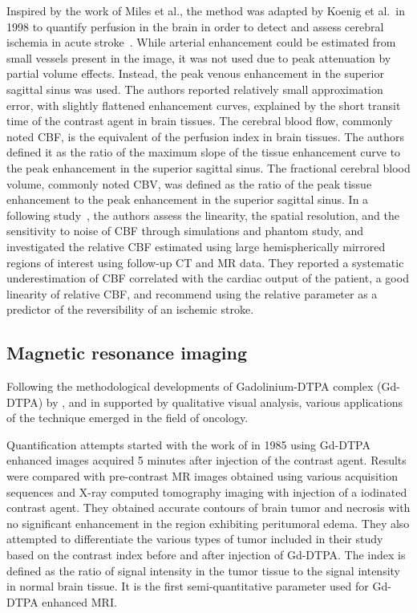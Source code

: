 Inspired by the work of Miles et al., the method was adapted by Koenig et al.~in 1998 to quantify perfusion in the brain in order to detect and assess cerebral ischemia in acute stroke~\cite{Koenig:1998ir}. 
While arterial enhancement could be estimated from small vessels present in the image, it was not used due to peak attenuation by partial volume effects. 
Instead, the peak venous enhancement in the superior sagittal sinus was used. 
The authors reported relatively small approximation error, with slightly flattened enhancement curves, explained by the short transit time of the contrast agent in brain tissues.
The cerebral blood flow, commonly noted CBF, is the equivalent of the perfusion index in brain tissues. 
The authors defined it as the ratio of the maximum slope of the tissue enhancement curve to the peak enhancement in the superior sagittal sinus.
The fractional cerebral blood volume, commonly noted CBV, was defined as the ratio of the peak tissue enhancement to the peak enhancement in the superior sagittal sinus. 
In a following study~\cite{Klotz:1999ef}, the authors assess the linearity, the spatial resolution, and the sensitivity to noise of CBF through simulations and phantom study, and investigated the relative CBF estimated using large hemispherically mirrored regions of interest using follow-up CT and MR data. 
They reported a systematic underestimation of CBF correlated with the cardiac output of the patient, a good linearity of relative CBF, and recommend using the relative parameter as a predictor of the reversibility of an ischemic stroke.


\subsection{Magnetic resonance imaging}
\label{sec:SQMR}
Following the methodological developments of Gadolinium-DTPA complex (Gd-DTPA) by \citet{Weinmann:1984gv,Brasch:1984cz}, and \citet{Wesbey:1984is} in \citeyear{Weinmann:1984gv} supported by qualitative visual analysis, various applications of the technique emerged in the field of oncology.

Quantification attempts started with the work of \citet{Felix:1985fv} in 1985 using Gd-DTPA enhanced images acquired 5 minutes after injection of the contrast agent. 
Results were compared with pre-contrast MR images obtained using various acquisition sequences and X-ray computed tomography imaging with injection of a iodinated contrast agent. 
They obtained accurate contours of brain tumor and necrosis with no significant enhancement in the region exhibiting peritumoral edema.
They also attempted to differentiate the various types of tumor included in their study based on the contrast index before and after injection of Gd-DTPA. 
The index is defined as the ratio of signal intensity in the tumor tissue to the signal intensity in normal brain tissue. 
It is the first semi-quantitative parameter used for Gd-DTPA enhanced MRI. %

